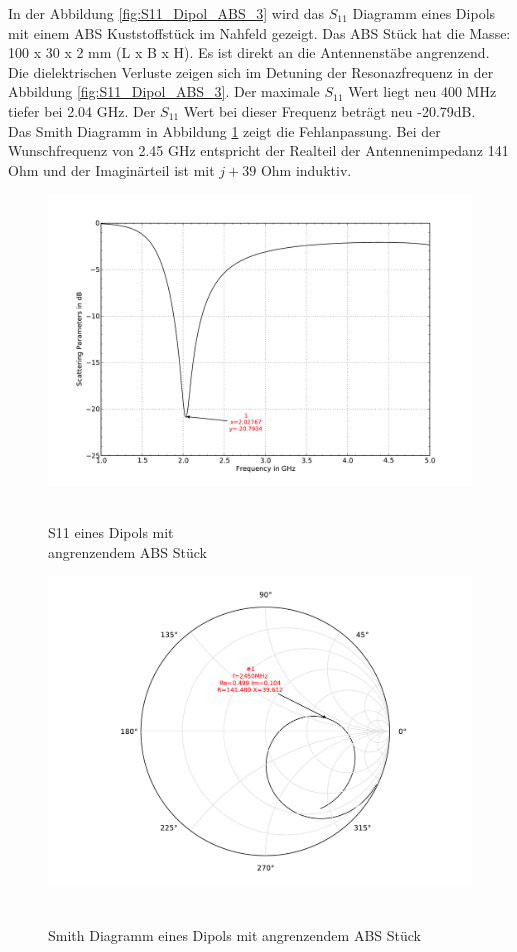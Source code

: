 In der Abbildung \ref{fig:S11_Dipol_ABS_3} wird das $S_{11}$ Diagramm eines Dipols mit einem ABS Kuststoffstück im Nahfeld gezeigt. Das ABS Stück hat die Masse: 100 x 30 x 2 mm (L x B x H). Es ist direkt an die Antennenstäbe angrenzend. Die dielektrischen Verluste zeigen sich im Detuning der Resonazfrequenz in der Abbildung \ref{fig:S11_Dipol_ABS_3}. Der maximale $S_{11}$ Wert liegt neu 400 MHz tiefer bei 2.04 GHz. Der $S_{11}$ Wert bei dieser Frequenz beträgt  neu -20.79dB.\\
Das Smith Diagramm in Abbildung \ref{fig:Smith_Dipol_ABS_4} zeigt die Fehlanpassung. Bei der Wunschfrequenz von 2.45 GHz entspricht der Realteil der Antennenimpedanz 141 Ohm und der Imaginärteil ist mit $j+39$ Ohm induktiv.
\begin{figure}[!h]
\begin{center}
  \includegraphics[width=\linewidth]{content/bilder/Evaluation/Dipol/S11DipolABS.pdf}
  \caption{\\S11 eines Dipols mit \\angrenzendem ABS Stück}\label{fig:S11_Dipol_ABS_3}
\endminipage%
{}
  \includegraphics[width=\linewidth]{content/bilder/Evaluation/Dipol/SmithDipolABS.pdf}
  \caption{\\Smith Diagramm eines Dipols mit angrenzendem ABS Stück}\label{fig:Smith_Dipol_ABS_4}
\endminipage
\end{center}
\end{figure}

